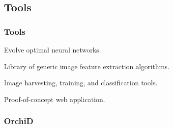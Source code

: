 \documentclass[]{beamer}
\begin{document}
    \subsection{Tools}

    \begin{frame}
        \frametitle{Tools}

        \begin{description}
            \item[\texttt{AIvolver}] Evolve optimal neural networks.
            \item[\texttt{ImgPheno}] Library of generic image feature extraction algorithms.
            \item[\texttt{NBClassify}] Image harvesting, training, and classification tools.
            \item[\texttt{OrchiD}] Proof-of-concept web application.
        \end{description}

    \end{frame}

    \begin{frame}[plain]
        \frametitle{OrchiD}

        \begin{center}
        \end{center}
    \end{frame}
\end{document}
